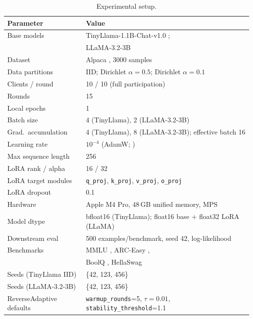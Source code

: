 \begin{table}[t]
\caption{Experimental setup.}
\label{tab:setup}
\begin{center}
\begin{tabular}{ll}
\toprule
Parameter & Value \\
\midrule
Base models & TinyLlama-1.1B-Chat-v1.0 \citep{zhang2024tinyllama}; \\
            & LLaMA-3.2-3B \citep{dubey2024llama3} \\
Dataset & Alpaca \citep{taori2023alpaca}, 3000 samples \\
Data partitions & IID; Dirichlet $\alpha{=}0.5$; Dirichlet $\alpha{=}0.1$ \\
Clients / round & 10 / 10 (full participation) \\
Rounds & 15 \\
Local epochs & 1 \\
Batch size & 4 (TinyLlama), 2 (LLaMA-3.2-3B) \\
Grad.\ accumulation & 4 (TinyLlama), 8 (LLaMA-3.2-3B); effective batch 16 \\
Learning rate & $10^{-4}$ (AdamW; \citealt{loshchilov2019decoupled}) \\
Max sequence length & 256 \\
LoRA rank / alpha & 16 / 32 \\
LoRA target modules & \texttt{q\_proj}, \texttt{k\_proj}, \texttt{v\_proj}, \texttt{o\_proj} \\
LoRA dropout & 0.1 \\
Hardware & Apple M4 Pro, 48\,GB unified memory, MPS \\
Model dtype & bfloat16 (TinyLlama); float16 base + float32 LoRA (LLaMA) \\
Downstream eval & 500 examples/benchmark, seed 42, log-likelihood \\
Benchmarks & MMLU \citep{hendrycks2020measuring}, ARC-Easy \citep{clark2018arc}, \\
            & BoolQ \citep{clark2019boolq}, HellaSwag \citep{zellers2019hellaswag} \\
Seeds (TinyLlama IID) & \{42, 123, 456\} \\
Seeds (LLaMA-3.2-3B) & \{42, 123, 456\} \\
ReverseAdaptive defaults & \texttt{warmup\_rounds}=5, $\tau{=}0.01$, \texttt{stability\_threshold}=1.1 \\
\bottomrule
\end{tabular}
\end{center}
\end{table}

